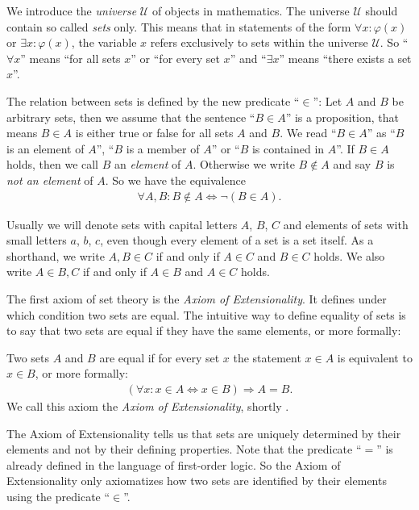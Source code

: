 We introduce the \emph{universe} $\mathcal{U}$ of objects in mathematics. The universe $\mathcal{U}$ should contain so called \emph{sets} only. This means that in statements of the form $\forall x\colon \varphi(x)$ or $\exists x\colon \varphi(x)$, the variable $x$ refers exclusively to sets within the universe $\mathcal U$. So \enquote{$\forall x$} means \enquote{for all sets $x$} or \enquote{for every set $x$} and \enquote{$\exists x$} means \enquote{there exists a set $x$}.

The relation between sets is defined by the new predicate \enquote{$\in$}: Let $A$ and $B$ be arbitrary sets, then we assume that the sentence \enquote{$B\in A$} is a proposition, that means $B\in A$ is either true or false for all sets $A$ and $B$. We read \enquote{$B\in A$} as \enquote{$B$ is an element of $A$}, \enquote{$B$ is a member of $A$} or \enquote{$B$ is contained in $A$}. If $B\in A$ holds, then we call $B$ an \emph{element} of $A$. Otherwise we write $B\notin A$ and say $B$ is \emph{not an element} of $A$. So we have the equivalence
\begin{align}\forall A,B\colon B\notin A\Leftrightarrow \lnot (B\in A).\end{align}

Usually we will denote sets with capital letters $A$, $B$, $C$ and elements of sets with small letters $a$, $b$, $c$, even though every element of a set is a set itself. As a shorthand, we write $A,B\in C$ if and only if $A\in C$ and $B\in C$ holds. We also write $A\in B,C$ if and only if $A\in B$ and $A\in C$ holds.

The first axiom of set theory is the \emph{Axiom of Extensionality}. It defines under which condition two sets are equal. The intuitive way to define equality of sets is to say that two sets are equal if they have the same elements, or more formally:

\begin{axiom}[Extensionality]
    Two sets $A$ and $B$ are equal if for every set $x$ the statement $x\in A$ is equivalent to $x\in B$, or more formally:
    \begin{align}(\forall x\colon x\in A\Leftrightarrow x\in B)\Longrightarrow A=B.\end{align}
    We call this axiom the \emph{Axiom of Extensionality}, shortly .
\end{axiom}

The Axiom of Extensionality tells us that sets are uniquely determined by their elements and not by their defining properties. Note that the predicate \enquote{$=$} is already defined in the language of first-order logic. So the Axiom of Extensionality only axiomatizes how two sets are identified by their elements using the predicate \enquote{$\in$}.


